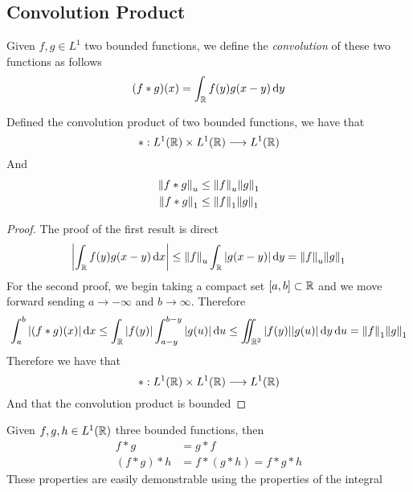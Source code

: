\documentclass[../complete.tex]{subfiles}
\begin{document}
\subsection{Convolution Product}
\begin{dfn}
	Given $f,g\in L^1$ two bounded functions, we define the \textit{convolution} of these two functions as follows
	\begin{equation}
		(f*g)(x)=\int_{\R}^{}f(y)g(x-y)\diff y
		\label{eq:convolution}
	\end{equation}
\end{dfn}
\begin{thm}
	Defined the convolution product of two bounded functions, we have that
	\begin{equation*}
		*:L^1(\R)\times L^1(\R)\fto L^1(\R)
	\end{equation*}
	And
	\begin{equation*}
		\begin{aligned}
			\unorm{f*g}&\le\unorm{f}\pnorm[1]{g}\\
			\pnorm[1]{f*g}&\le\pnorm[1]{f}\pnorm[1]{g}
		\end{aligned}
	\end{equation*}
\end{thm}
\begin{proof}
	The proof of the first result is direct
	\begin{equation*}
		\abs{\int_{\R}^{}f(y)g(x-y)\diff x}\le\unorm{f}\int_{\R}^{}\abs{g(x-y)}\diff y=\unorm{f}\pnorm[1]{g}
	\end{equation*}
	For the second proof, we begin taking a compact set $[a,b]\subset\R$ and we move forward sending $a\to-\infty$ and $b\to\infty$. Therefore
	\begin{equation*}
		\int_{a}^{b}\abs{(f*g)(x)}\diff x\le\int_{\R}^{}\abs{f(y)}\int_{a-y}^{b-y}\abs{g(u)}\diff u\le\iint_{\R^2}\abs{f(y)}\abs{g(u)}\diff y\diff u=\pnorm[1]{f}\pnorm[1]{g}
	\end{equation*}
	Therefore we have that
	\begin{equation*}
		*:L^1(\R)\times L^1(\R)\fto L^1(\R)
	\end{equation*}
	And that the convolution product is bounded
\end{proof}
\begin{thm}
	Given $f,g,h\in L^1(\R)$ three bounded functions, then
	\begin{equation}
		\begin{aligned}
			f*g&=g*f\\
			(f*g)*h&=f*(g*h)=f*g*h
		\end{aligned}
		\label{eq:propertiesconv}
	\end{equation}
	These properties are easily demonstrable using the properties of the integral
\end{thm}
\end{document}
